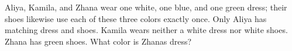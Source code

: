 Aliya, Kamila, and Zhana wear one white, one blue, and one green dress; their shoes likewise use each of these three colors exactly once. Only Aliya has matching dress and shoes. Kamila wears neither a white dress nor white shoes. Zhana has green shoes. What color is Zhana\textquotesingle s dress?
